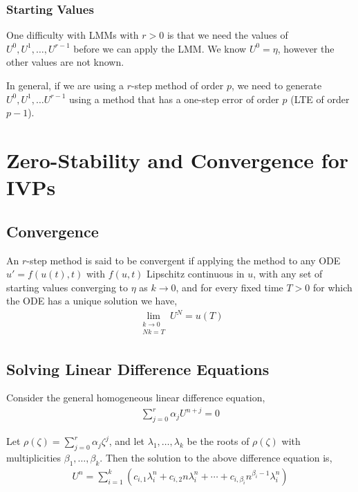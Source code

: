 \documentclass[12pt]{article}
\begin{document}
\subsubsection{Starting Values}
One difficulty with LMMs with \( r>0 \) is that we need the values of \( U^0, U^1, \ldots, U^{r-1} \) before we can apply the LMM. We know \( U^0 = \eta \), however the other values are not known.


In general, if we are using a \( r \)-step method of order \( p \), we need to generate \( U^0, U^1, \ldots U^{r-1} \) using a method that has a one-step error of order \( p \) (LTE of order \( p-1 \)). 


\section{Zero-Stability and Convergence for IVPs}

\subsection{Convergence}

\begin{definition}
    An \( r \)-step method is said to be convergent if applying the method to any ODE \( u' = f(u(t),t) \) with \( f(u,t) \) Lipschitz continuous in \( u \), with any set of starting values converging to \( \eta \) as \( k\to 0 \), and for every fixed time \( T>0 \) for which the ODE has a unique solution we have,
\begin{align*}
    \lim_{\substack{k\to 0\\Nk = T}} U^N =  u(T)
\end{align*}
    
\end{definition}

\subsection{Solving Linear Difference Equations}
Consider the general homogeneous linear difference equation,
\begin{align*}
    \sum_{j=0}^{r} \alpha_j U^{n+j} = 0
\end{align*}

Let \( \rho(\zeta) = \sum_{j=0}^{r} \alpha_j \zeta^j \), and let \( \lambda_1, \ldots, \lambda_{k} \) be the roots of \( \rho(\zeta) \) with multiplicities \( \beta_1, \ldots, \beta_k \). Then the solution to the above difference equation is,
\begin{align*}
    U^n =  \sum_{i=1}^{k} \left (c_{i,1} \lambda_i^n + c_{i,2} n \lambda_i^n + \cdots + c_{i,\beta_i} n^{\beta_i-1}\lambda_i^n\right)
\end{align*}
\end{document}
